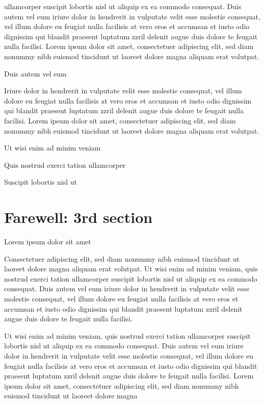 \documentclass[11pt]{article}\makeatletter
\makeatletter
\renewcommand\section{\@startsection {section}{1}{\z@}%
     {-1.75ex \@plus -0.5ex \@minus -.2ex}%
     {0.5ex \@plus .2ex}%
     {\reset@font\Large\bfseries\sffamily}}
\def\DivI{\section}
\def\DivI{\chapter}
\makeatother
\begin{document}
      ullamcorper suscipit lobortis nisl ut aliquip ex ea commodo
      consequat. Duis autem vel eum iriure dolor in hendrerit in vulputate
      velit esse molestie consequat, vel illum dolore eu feugiat nulla
      facilisis at vero eros et accumsan et iusto odio dignissim qui blandit
      praesent luptatum zzril delenit augue duis dolore te feugait nulla
      facilisi. Lorem ipsum dolor sit amet, consectetuer adipiscing elit,
      sed diam nonummy nibh euismod tincidunt ut laoreet dolore magna
      aliquam erat volutpat. \par Duis autem vel eum \par Iriure dolor in hendrerit in vulputate velit esse molestie
      consequat, vel illum dolore eu feugiat nulla facilisis at vero eros et
      accumsan et iusto odio dignissim qui blandit praesent luptatum zzril
      delenit augue duis dolore te feugait nulla facilisi. Lorem ipsum dolor
      sit amet, consectetuer adipiscing elit, sed diam nonummy nibh euismod
      tincidunt ut laoreet dolore magna aliquam erat volutpat. \par Ut wisi enim ad minim veniam\par Quis nostrud exerci tation ullamcorper \par Suscipit lobortis nisl ut 
\DivI[Farewell: 3rd section]{Farewell: 3rd section}\label{part3}\par Lorem ipsum dolor sit amet\par Consectetuer adipiscing elit, sed diam nonummy nibh euismod
      tincidunt ut laoreet dolore magna aliquam erat volutpat. Ut wisi enim
      ad minim veniam, quis nostrud exerci tation ullamcorper suscipit
      lobortis nisl ut aliquip ex ea commodo consequat. Duis autem vel eum
      iriure dolor in hendrerit in vulputate velit esse molestie consequat,
      vel illum dolore eu feugiat nulla facilisis at vero eros et accumsan
      et iusto odio dignissim qui blandit praesent luptatum zzril delenit
      augue duis dolore te feugait nulla facilisi.\par Ut wisi enim ad minim veniam, quis nostrud exerci tation
      ullamcorper suscipit lobortis nisl ut aliquip ex ea commodo
      consequat. Duis autem vel eum iriure dolor in hendrerit in vulputate
      velit esse molestie consequat, vel illum dolore eu feugiat nulla
      facilisis at vero eros et accumsan et iusto odio dignissim qui blandit
      praesent luptatum zzril delenit augue duis dolore te feugait nulla
      facilisi. Lorem ipsum dolor sit amet, consectetuer adipiscing elit,
      sed diam nonummy nibh euismod tincidunt ut laoreet dolore magna
\end{document}

